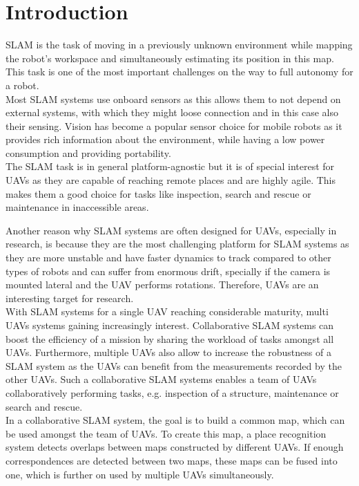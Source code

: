 \chapter{Introduction}
\label{sec:introduction}

\acf{SLAM} is the task of moving in a previously unknown environment while mapping the robot’s workspace and simultaneously estimating its position in this map. This task is one of the most important challenges on the way to full autonomy for a robot.\\

Most \ac{SLAM} systems use onboard sensors as this allows them to not depend on external systems, with which they might loose connection and in this case also their sensing. Vision has become a popular sensor choice for mobile robots as it provides rich information about the environment, while having a low power consumption and providing portability.\\

The \ac{SLAM} task is in general platform-agnostic but it is of special interest for \acfp{UAV} as they are capable of reaching remote places and are highly agile. This makes them a good choice for tasks like inspection, search and rescue or maintenance in inaccessible areas. 

Another reason why \ac{SLAM} systems are often designed for \acp{UAV}, especially in research, is because they are the most challenging platform for \ac{SLAM} systems as they are more unstable and have faster dynamics to track compared to other types of robots and can suffer from enormous drift, specially if the camera is mounted lateral and the \ac{UAV} performs rotations. Therefore, \acp{UAV} are an interesting target for research.\\

With \ac{SLAM} systems for a single \ac{UAV} reaching considerable maturity, multi \acp{UAV} systems gaining increasingly interest. Collaborative \ac{SLAM} systems can boost the efficiency of a mission by sharing the workload of tasks amongst all \acp{UAV}. Furthermore, multiple \acp{UAV} also allow to increase the robustness of a \ac{SLAM} system as the \acp{UAV} can benefit from the measurements recorded by the other \acp{UAV}. Such a collaborative \ac{SLAM} systems enables a team of \acp{UAV} collaboratively performing tasks, e.g. inspection of a structure, maintenance or search and rescue.\\

In a collaborative \ac{SLAM} system, the goal is to build a common map, which can be used amongst the team of \acp{UAV}. To create this map, a place recognition system detects overlaps between maps constructed by different \acp{UAV}. If enough correspondences are detected between two maps, these maps can be fused into one, which is further on used by multiple \acp{UAV} simultaneously.\\


